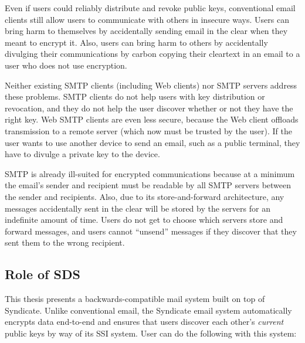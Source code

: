 Even if users could reliably distribute and revoke public keys, conventional
email clients still allow users to communicate with others in insecure ways.
Users can bring harm to themselves by accidentally sending email in the clear
when they meant to encrypt it.  Also, users can bring harm to others
by accidentally divulging their communications by carbon copying
their cleartext in an email to a user who does not use encryption.

Neither existing SMTP clients (including Web clients) nor
SMTP servers address these problems.  SMTP clients do not help users with key
distribution or revocation, and they do not help the user discover whether or
not they have the right key.  Web SMTP clients are even less secure, because the
Web client offloads transmission to a remote server (which now must be trusted
by the user).  If the user wants to use another device to send an email, such as
a public terminal, they have to divulge a private key to the device.

SMTP is already ill-suited for encrypted communications because at a minimum the email's
sender and recipient must be readable by all SMTP servers between the sender and
recipients.  Also, due to its store-and-forward architecture, any messages
accidentally sent in the clear will be stored by the servers for an
indefinite amount of time.  Users do not get to choose which servers store and forward
messages, and users cannot ``unsend'' messages if they discover that they sent
them to the wrong recipient.

\subsection{Role of SDS}

This thesis presents a backwards-compatible mail system built on top of
Syndicate.  Unlike conventional email, the Syndicate email system
automatically encrypts data end-to-end and ensures that users
discover each other's \emph{current} public keys by way of its SSI
system.  User can do the following with this system:

